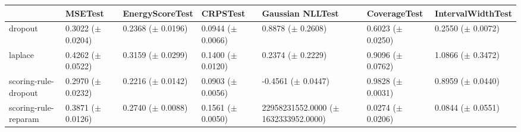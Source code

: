 \begin{tabular}{lllllll}
\toprule
 & MSETest & EnergyScoreTest & CRPSTest & Gaussian NLLTest & CoverageTest & IntervalWidthTest \\
\midrule
dropout & \makecell{0.3022 \\ ($\pm$ 0.0204)} & \makecell{0.2368 \\ ($\pm$ 0.0196)} & \makecell{0.0944 \\ ($\pm$ 0.0066)} & \makecell{0.8878 \\ ($\pm$ 0.2608)} & \makecell{0.6023 \\ ($\pm$ 0.0250)} & \makecell{0.2550 \\ ($\pm$ 0.0072)} \\
laplace & \makecell{0.4262 \\ ($\pm$ 0.0522)} & \makecell{0.3159 \\ ($\pm$ 0.0299)} & \makecell{0.1400 \\ ($\pm$ 0.0120)} & \makecell{0.2374 \\ ($\pm$ 0.2229)} & \makecell{0.9096 \\ ($\pm$ 0.0762)} & \makecell{1.0866 \\ ($\pm$ 0.3472)} \\
scoring-rule-dropout & \makecell{0.2970 \\ ($\pm$ 0.0232)} & \makecell{0.2216 \\ ($\pm$ 0.0142)} & \makecell{0.0903 \\ ($\pm$ 0.0056)} & \makecell{-0.4561 \\ ($\pm$ 0.0447)} & \makecell{0.9828 \\ ($\pm$ 0.0031)} & \makecell{0.8959 \\ ($\pm$ 0.0440)} \\
scoring-rule-reparam & \makecell{0.3871 \\ ($\pm$ 0.0126)} & \makecell{0.2740 \\ ($\pm$ 0.0088)} & \makecell{0.1561 \\ ($\pm$ 0.0050)} & \makecell{22958231552.0000 \\ ($\pm$ 1632333952.0000)} & \makecell{0.0274 \\ ($\pm$ 0.0206)} & \makecell{0.0844 \\ ($\pm$ 0.0551)} \\
\bottomrule
\end{tabular}

